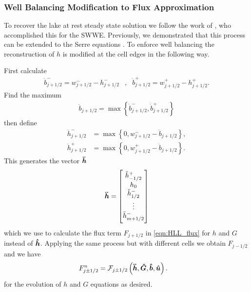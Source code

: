 \subsubsection{Well Balancing Modification to Flux Approximation}
To recover the lake at rest steady state solution we follow the work of \citet{Klein-etal-2004-2050}, who accomplished this for the SWWE. Previously, we demonstrated that this process can be extended to the Serre equations \cite{Pitt-J-2014}. To enforce well balancing the reconstruction of $h$ is modified at the cell edges in the following way.

First calculate
\begin{align}
\dot{b}^-_{j+1/2} = w^-_{j+1/2} - h^-_{j+1/2} &, &\dot{b}^+_{j+1/2} = w^+_{j+1/2} - h^+_{j+1/2}.
\label{eqn:BedReDefWmH}
\end{align}
Find the maximum
\begin{align*}
\ddot{b}_{j+1/2} = \max\left\lbrace\dot{b}^-_{j+1/2} , \dot{b}^+_{j+1/2} \right\rbrace
\end{align*}
then define
\begin{subequations}
\begin{align}
\ddot{h}^-_{j+1/2} &= \max\left\lbrace 0, w^-_{j+1/2} - \ddot{b}_{j+1/2}  \right\rbrace, \\  \ddot{h}^+_{j+1/2} &= \max\left\lbrace 0, w^+_{j+1/2} - \ddot{b}_{j+1/2} \right\rbrace.
\end{align}
\label{eqn:ModifiedHValue}
\end{subequations}
This generates the vector $\boldsymbol{\ddot{h}}$
\begin{equation*}
\vecn{\ddot{h}}= \begin{bmatrix} \TM
\ddot{h}^+_{-1/2} \\ h_0 \\ \ddot{h}^-_{1/2} \\ \vdots  \\ \ddot{h}^-_{m + 1/2}  \BM \end{bmatrix}
\end{equation*}
which we use to calculate the flux term $F_{j+1/2}$ in \eqref{eqn:HLL_flux} for $h$ and $G$ instead of $\boldsymbol{\hat{h}}$. Applying the same process but with different cells we obtain $F_{j-1/2}$ and we have
\begin{align*}	
F^n_{j\pm 1/2} &=\mathcal{F}_{j\pm1/2} \left(\boldsymbol{\ddot{h}}, \boldsymbol{\hat{G}},\boldsymbol{\hat{b}}, \boldsymbol{\hat{u}}  \right).
\end{align*}
for the evolution of $h$ and $G$ equations as desired.


